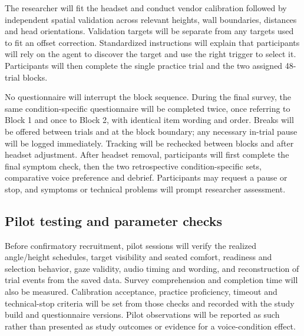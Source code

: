 \documentclass[11pt,letterpaper]{article}
\begin{document}
The researcher will fit the headset and conduct vendor calibration followed by independent spatial validation across relevant heights, wall boundaries, distances and head orientations. Validation targets will be separate from any targets used to fit an offset correction. Standardized instructions will explain that participants will rely on the agent to discover the target and use the right trigger to select it. Participants will then complete the single practice trial and the two assigned 48-trial blocks.

No questionnaire will interrupt the block sequence. During the final survey, the same condition-specific questionnaire will be completed twice, once referring to Block 1 and once to Block 2, with identical item wording and order. Breaks will be offered between trials and at the block boundary; any necessary in-trial pause will be logged immediately. Tracking will be rechecked between blocks and after headset adjustment. After headset removal, participants will first complete the final symptom check, then the two retrospective condition-specific sets, comparative voice preference and debrief. Participants may request a pause or stop, and symptoms or technical problems will prompt researcher assessment.

\subsection{Pilot testing and parameter checks}
Before confirmatory recruitment, pilot sessions will verify the realized angle/height schedules, target visibility and seated comfort, readiness and selection behavior, gaze validity, audio timing and wording, and reconstruction of trial events from the saved data. Survey comprehension and completion time will also be measured. Calibration acceptance, practice proficiency, timeout and technical-stop criteria will be set from those checks and recorded with the study build and questionnaire versions. Pilot observations will be reported as such rather than presented as study outcomes or evidence for a voice-condition effect.
\end{document}
